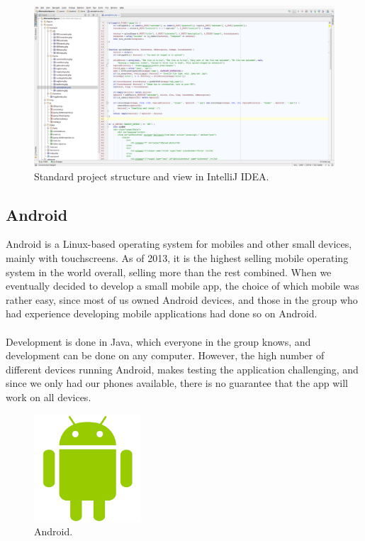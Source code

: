 \begin{figure}[ht!]
  \centering
  \includegraphics[width=\linewidth]{./Planning/img/IntelliJ}
  \caption{Standard project structure and view in IntelliJ IDEA.}
  \label{fig:PlanningSoftwareDevIntelliJView}
\end{figure}

\subsection{Android}
\label{subsec:PlanningSoftwareDevAndroid}

Android is a Linux-based operating system for mobiles and other small devices, mainly with touchscreens. As of 2013, it is the highest selling mobile operating system in the world overall, selling more than the rest combined. When we eventually decided to develop a small mobile app, the choice of which mobile was rather easy, since most of us owned Android devices, and those in the group who had experience developing mobile applications had done so on Android.

\paragraph{} Development is done in Java, which everyone in the group knows, and development can be done on any computer. However, the high number of different devices running Android, makes testing the application challenging, and since we only had our phones available, there is no guarantee that the app will work on all devices.

\begin{figure}[ht!]
  \centering
  \includegraphics[width=40mm]{./Planning/img/AndroidLogo}
  \caption{Android.}
  \label{fig:PlanningSoftwareDevAndroid}
\end{figure}


